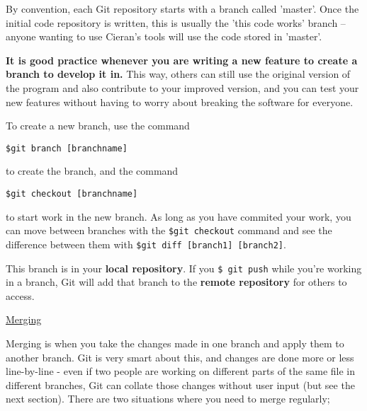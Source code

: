 \documentclass[11pt, a4paper, english]{article}
\begin{document}
By convention, each Git repository starts with a branch called 'master'. Once the initial code repository is written, this is usually the 'this code works' branch -- anyone wanting to use Cieran's tools will use the code stored in 'master'. 

\textbf{It is good practice whenever you are writing a new feature to create a branch to develop it in.} This way, others can still use the original version of the program and also contribute to your improved version, and you can test your new features without having to worry about breaking the software for everyone.

To create a new branch, use the command

\begin{verbatim}
$git branch [branchname]
\end{verbatim}

to  create the branch, and the command

\begin{verbatim}
$git checkout [branchname]
\end{verbatim}

to start work in the new branch. As long as you have commited your work, you can move between branches with the \verb|$git checkout| command and see the difference between them with \verb|$git diff [branch1] [branch2]|.

This branch is in your \textbf{local repository}. If you \verb|$ git push| while you're working in a branch, Git will add that branch to the \textbf{remote repository} for others to access.

\underline{Merging}

Merging is when you take the changes made in one branch and apply them to another branch. Git is very smart about this, and changes are done more or less line-by-line - even if two people are working on different parts of the same file in different branches, Git can collate those changes without user input (but see the next section). There are two situations where you need to merge regularly;
\end{document}
